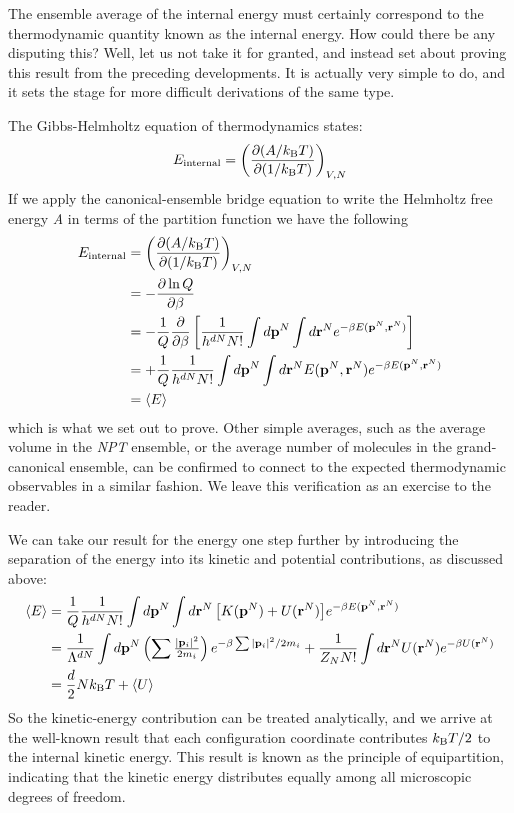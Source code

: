 \documentclass[9pt,bestpractices]{molsim}
\begin{document}
The ensemble average of the internal energy must certainly correspond to
the thermodynamic quantity known as the internal energy. How could there
be any disputing this? Well, let us not take it for granted, and instead
set about proving this result from the preceding developments. It is
actually very simple to do, and it sets the stage for more difficult
derivations of the same type.

The Gibbs-Helmholtz equation of thermodynamics states:
\[{E_{{\rm{internal}}}} = {\left( {\frac{{\partial (A/{k_{\rm B}}T)}}{{\partial (1/{k_{\rm B}}T)}}} \right)_{V,N}}\]
If we apply the canonical-ensemble bridge equation to write the
Helmholtz free energy \emph{A} in terms of the partition function we
have the following
\begin{align*}
{E_{{\rm{internal}}}} &= {\left( {\frac{{\partial (A/k_{\rm B}T)}}{{\partial (1/k_{\rm B}T)}}} \right)_{V,N}}\\
 &=  - \frac{{\partial \ln Q}}{{\partial \beta }}\\
 &=  - \frac{1}{Q}\frac{\partial }{{\partial \beta }}\left[\frac{1}{h^{dN}N!}\int {d{{\bf p}^N}\int {d{{\bf r}^N}} {e^{ - \beta E({{\bf p}^N},{{\bf r}^N})}}} \right]\\
 &=  + \frac{1}{Q}{\frac{1}{h^{dN}N!}\int {d{{\bf p}^N}\int {d{{\bf r}^N}E({{\bf p}^N},{{\bf r}^N})} {e^{ - \beta E({{\bf p}^N},{{\bf r}^N})}}}} \\
 &= \left\langle E \right\rangle 
\end{align*}
which is what we set out to prove. Other simple averages, such as the
average volume in the \emph{NPT} ensemble, or the average number of molecules
in the grand-canonical ensemble, can be confirmed to connect to the
expected thermodynamic observables in a similar fashion. We leave this
verification as an exercise to the reader.

We can take our result for the energy one step further by introducing
the separation of the energy into its kinetic and potential
contributions, as discussed above:
\begin{align*}
\left\langle E \right\rangle  &= \frac{1}{Q}\frac{1}{{{h^{dN}}N!}}\int {d{{\bf{p}}^N}\int {d{{\bf{r}}^N}\left[ {K({{\bf{p}}^N}) + U({{\bf{r}}^N})} \right]} {e^{ - \beta E({{\bf{p}}^N},{{\bf{r}}^N})}}} \\
 &= \frac{1}{{{\Lambda ^{dN}}}}\int {d{{\bf{p}}^N}\left( {\sum {{\textstyle{{{{\left| {{{\bf{p}}_i}} \right|}^2}} \over {2{m_i}}}}} } \right){e^{ - \beta \sum {{{\left| {{{\bf{p}}_i}} \right|}^2}/2{m_i}} }}}  + \frac{1}{{{Z_N}N!}}\int {d{{\bf{r}}^N}U({{\bf{r}}^N}){e^{ - \beta U({{\bf{r}}^N})}}} \\
 &= \frac{d}{2}Nk_{\rm B}T + \left\langle U \right\rangle 
\end{align*}
So the kinetic-energy contribution can be treated analytically, and we
arrive at the well-known result that each configuration coordinate
contributes $k_{\rm B}T/2$ to the internal kinetic energy. This result is known as
the principle of equipartition, indicating that the kinetic energy
distributes equally among all microscopic degrees of freedom.
\end{document}
